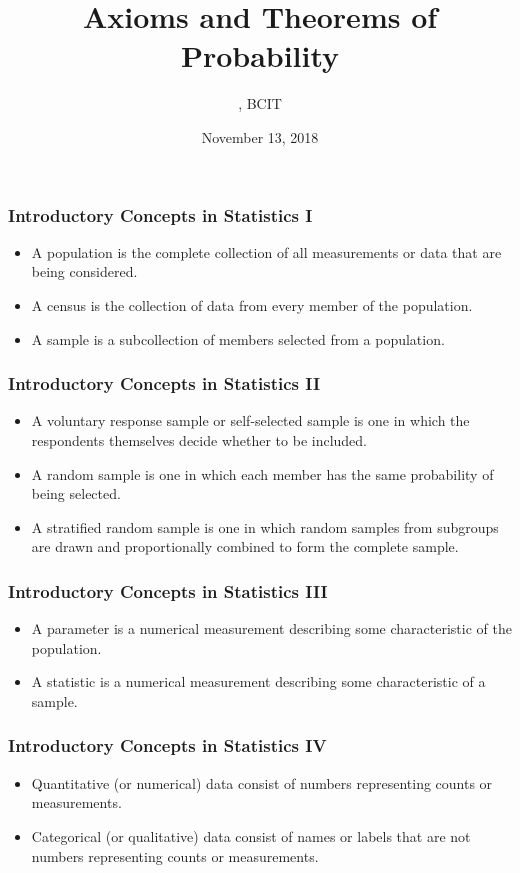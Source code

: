 \documentclass[xcolor=dvipsnames]{beamer}
\title{Axioms and Theorems of Probability}
\subtitle{{\CourseNumber}, BCIT}
\author{\CourseName}
\date{November 13, 2018}
\begin{document}
\begin{frame}
  \titlepage
\end{frame}

\begin{frame}
  \frametitle{Introductory Concepts in Statistics I}
  \begin{itemize}
  \item<1-> A \alert{population} is the complete collection of all
    measurements or data that are being considered.
  \item<2-> A \alert{census} is the collection of data from every
    member of the population.
  \item<3-> A \alert{sample} is a subcollection of members selected
    from a population.
  \end{itemize}
\end{frame}

\begin{frame}
  \frametitle{Introductory Concepts in Statistics II}
  \begin{itemize}
  \item<1-> A \alert{voluntary response sample} or
    \alert{self-selected sample} is one in which the respondents
    themselves decide whether to be included.
  \item<2-> A \alert{random sample} is one in which each member has
    the same probability of being selected.
  \item<3-> A \alert{stratified random sample} is one in which random
    samples from subgroups are drawn and proportionally combined to
    form the complete sample.
  \end{itemize}
\end{frame}

\begin{frame}
  \frametitle{Introductory Concepts in Statistics III}
  \begin{itemize}
  \item<1-> A \alert{parameter} is a numerical measurement describing
    some characteristic of the population.
  \item<2-> A \alert{statistic} is a numerical measurement describing
    some characteristic of a sample.
  \end{itemize}
\end{frame}

\begin{frame}
  \frametitle{Introductory Concepts in Statistics IV}
  \begin{itemize}
  \item<1-> \alert{Quantitative} (or \alert{numerical}) data consist
    of numbers representing counts or measurements.
  \item<2-> \alert{Categorical} (or \alert{qualitative}) data consist
    of names or labels that are not numbers representing counts or
    measurements.
  \end{itemize}
\end{frame}
\end{document}
